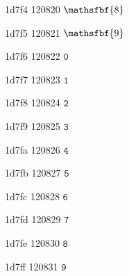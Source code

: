 \documentclass[11pt]{article}
\begin{document}
1d7f4 120820 \ensuremath{\mathsfbf{8}}

1d7f5 120821 \ensuremath{\mathsfbf{9}}

1d7f6 120822 \ensuremath{\mathtt{0}}

1d7f7 120823 \ensuremath{\mathtt{1}}

1d7f8 120824 \ensuremath{\mathtt{2}}

1d7f9 120825 \ensuremath{\mathtt{3}}

1d7fa 120826 \ensuremath{\mathtt{4}}

1d7fb 120827 \ensuremath{\mathtt{5}}

1d7fc 120828 \ensuremath{\mathtt{6}}

1d7fd 120829 \ensuremath{\mathtt{7}}

1d7fe 120830 \ensuremath{\mathtt{8}}

1d7ff 120831 \ensuremath{\mathtt{9}}
\end{document}
